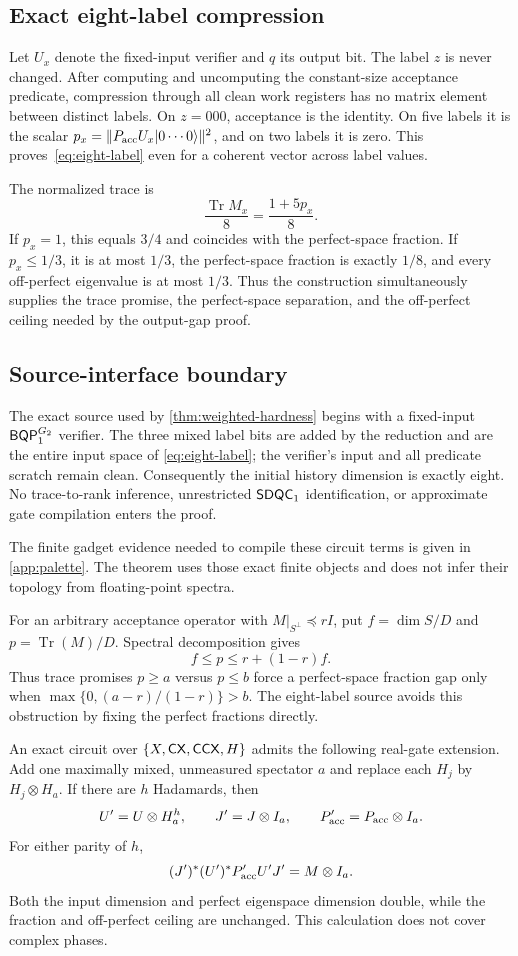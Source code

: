 \subsection{Exact eight-label compression}

Let \(U_x\) denote the fixed-input verifier and \(q\) its output bit. The label \(z\) is never changed. After computing and uncomputing the constant-size acceptance predicate, compression through all clean work registers has no matrix element between distinct labels. On \(z=000\), acceptance is the identity. On five labels it is the scalar
\(
p_x=\|P_{\rm acc}U_x\lvert 0\cdots0\rangle\|^2
\),
and on two labels it is zero. This proves~\cref{eq:eight-label} even for a coherent vector across label values.

The normalized trace is
\[
\frac{\operatorname{Tr}M_x}{8}
=\frac{1+5p_x}{8}.
\]
If \(p_x=1\), this equals \(3/4\) and coincides with the perfect-space fraction. If \(p_x\le1/3\), it is at most \(1/3\), the perfect-space fraction is exactly \(1/8\), and every off-perfect eigenvalue is at most \(1/3\). Thus the construction simultaneously supplies the trace promise, the perfect-space separation, and the off-perfect ceiling needed by the output-gap proof.

\subsection{Source-interface boundary}
\label{app:source-boundaries}

The exact source used by \cref{thm:weighted-hardness} begins with a
fixed-input \(\mathsf{BQP}_{1}^{G_2}\) verifier.  The three mixed label bits are added
by the reduction and are the entire input space of
\cref{eq:eight-label}; the verifier's input and all predicate scratch remain
clean.  Consequently the initial history dimension is exactly eight.  No
trace-to-rank inference, unrestricted \(\mathsf{SDQC}_{1}\) identification, or
approximate gate compilation enters the proof.

The finite gadget evidence needed to compile these circuit terms is given in
\cref{app:palette}.  The theorem uses those exact finite objects and does not
infer their topology from floating-point spectra.

For an arbitrary acceptance operator with
\(M|_{S^\perp}\preceq rI\), put \(f=\dim S/D\) and
\(p=\operatorname{Tr}(M)/D\).  Spectral decomposition gives
\[
f\le p\le r+(1-r)f.
\]
Thus trace promises \(p\ge a\) versus \(p\le b\) force a perfect-space
fraction gap only when
\(\max\{0,(a-r)/(1-r)\}>b\).  The eight-label source avoids this obstruction
by fixing the perfect fractions directly.

An exact circuit over \(\{X,\mathsf{CX},\mathsf{CCX},H\}\) admits the following real-gate
extension.  Add one maximally mixed, unmeasured spectator \(a\) and replace
each \(H_j\) by \(H_j\otimes H_a\).  If there are \(h\) Hadamards, then
\[
U'=U\otimes H_a^h,\qquad J'=J\otimes I_a,\qquad
P'_{\rm acc}=P_{\rm acc}\otimes I_a.
\]
For either parity of \(h\),
\[
(J')^*(U')^*P'_{\rm acc}U'J'=M\otimes I_a.
\]
Both the input dimension and perfect eigenspace dimension double, while the
fraction and off-perfect ceiling are unchanged.  This calculation does not
cover complex phases.
